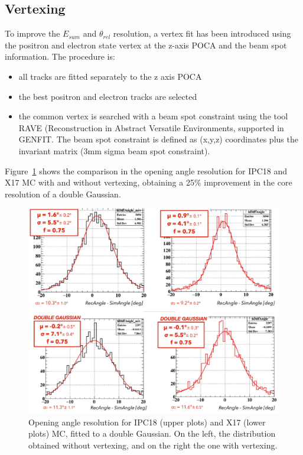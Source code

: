 \begin{refsection}
        \subsection{Vertexing}
        To improve the $E_{sum}$ and $\theta_{rel}$ resolution, a vertex fit has been introduced using the positron and electron state vertex at the z-axis POCA and the beam spot information.
        The procedure is:
        \begin{itemize}
            \item all tracks are fitted separately to the z axis POCA
            \item the best positron and electron tracks are selected
            \item the common vertex is searched with a beam spot constraint using the tool RAVE (Reconstruction in Abstract Versatile Environments, supported in GENFIT. The beam spot constraint is defined as (x,y,z) coordinates plus the invariant matrix (3mm sigma beam spot constraint). 
        \end{itemize}
        Figure~\ref{fig:vertexing} shows the comparison in the opening angle resolution for IPC18 and X17 MC with and without vertexing, obtaining a 25$\%$ improvement in the core resolution of a double Gaussian.
        
        \begin{figure}[htbp]
            \centering
            \includegraphics[scale=0.5]{Figures/X17/Analysis/Vertexing.pdf}
            \caption{Opening angle resolution for IPC18 (upper plots) and X17 (lower plots) MC, fitted to a double Gaussian. On the left, the distribution obtained without vertexing, and on the right the one with vertexing.}
             \label{fig:vertexing}
        \end{figure}


\end{refsection}

